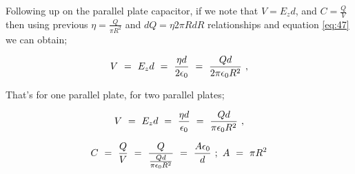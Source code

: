 \documentclass{article}
\begin{document}
Following up on the parallel plate capacitor, if we note that \begin{math} V = E_{z} d \end{math}, and \begin{math} C = \frac{Q}{V} \end{math} then using previous \begin{math} \eta = \frac{Q}{\pi R^{2}} \end{math} and \begin{math} dQ = \eta 2 \pi R dR \end{math} relationships and equation \ref{eq:47} we can obtain; 

\begin{equation} \label{eq:49}
V \hspace{0.125cm} = \hspace{0.125cm} E_{z} d \hspace{0.125cm} = \hspace{0.125cm} \frac{\eta d}{2\epsilon_{0}} \hspace{0.125cm} = \hspace{0.125cm} \frac{Qd}{2\pi\epsilon_{0}R^2} \hspace{0.125cm} ,
\end{equation}

That's for one parallel plate, for two parallel plates;

\begin{equation} \label{eq:50}
V \hspace{0.125cm} = \hspace{0.125cm} E_{z} d \hspace{0.125cm} = \hspace{0.125cm} \frac{\eta d}{\epsilon_{0}} \hspace{0.125cm} = \hspace{0.125cm} \frac{Qd}{\pi\epsilon_{0}R^2} \hspace{0.125cm} ,
\end{equation}

\begin{equation} \label{eq:51}
C \hspace{0.125cm} = \hspace{0.125cm} \frac{Q}{V} \hspace{0.125cm} = \hspace{0.125cm} \frac{Q}{\frac{Qd}{\pi\epsilon_{0}R^2}} \hspace{0.125cm} = \hspace{0.125cm} \frac{A\epsilon_{0}}{d} \hspace{0.125cm} ; \hspace{0.125cm} A \hspace{0.125cm} = \hspace{0.125cm} \pi R^2 
\end{equation}
\end{document}
